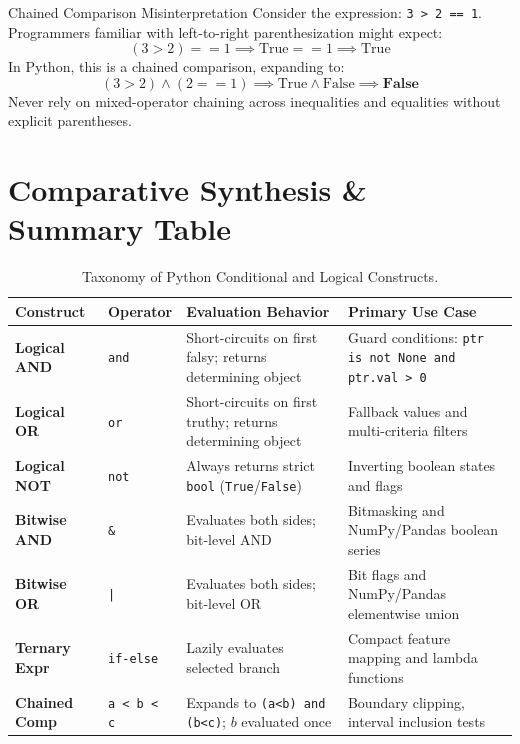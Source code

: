 \begin{trapbox}{Chained Comparison Misinterpretation}
Consider the expression: \texttt{3 > 2 == 1}.
Programmers familiar with left-to-right parenthesization might expect:
\begin{equation*}
(3 > 2) == 1 \implies \text{True} == 1 \implies \text{True}
\end{equation*}
In Python, this is a chained comparison, expanding to:
\begin{equation*}
(3 > 2) \land (2 == 1) \implies \text{True} \land \text{False} \implies \mathbf{False}
\end{equation*}
Never rely on mixed-operator chaining across inequalities and equalities without explicit parentheses.
\end{trapbox}

\section{Comparative Synthesis \& Summary Table}

\begin{table}[htbp]
\centering
\small
\begin{tabular}{p{2.8cm} p{2.2cm} p{3.8cm} p{4.2cm}}
\hline
\textbf{Construct} & \textbf{Operator} & \textbf{Evaluation Behavior} & \textbf{Primary Use Case} \\
\hline
\textbf{Logical AND} & \texttt{and} & Short-circuits on first falsy; returns determining object & Guard conditions: \texttt{ptr is not None and ptr.val > 0} \\
\textbf{Logical OR} & \texttt{or} & Short-circuits on first truthy; returns determining object & Fallback values and multi-criteria filters \\
\textbf{Logical NOT} & \texttt{not} & Always returns strict \texttt{bool} (\texttt{True}/\texttt{False}) & Inverting boolean states and flags \\
\textbf{Bitwise AND} & \texttt{\&} & Evaluates both sides; bit-level AND & Bitmasking and NumPy/Pandas boolean series \\
\textbf{Bitwise OR} & \texttt{|} & Evaluates both sides; bit-level OR & Bit flags and NumPy/Pandas elementwise union \\
\textbf{Ternary Expr} & \texttt{if-else} & Lazily evaluates selected branch & Compact feature mapping and lambda functions \\
\textbf{Chained Comp} & \texttt{a < b < c} & Expands to \texttt{(a<b) and (b<c)}; $b$ evaluated once & Boundary clipping, interval inclusion tests \\
\hline
\end{tabular}
\caption{Taxonomy of Python Conditional and Logical Constructs.}
\label{tab:conditionals_summary}
\end{table}


